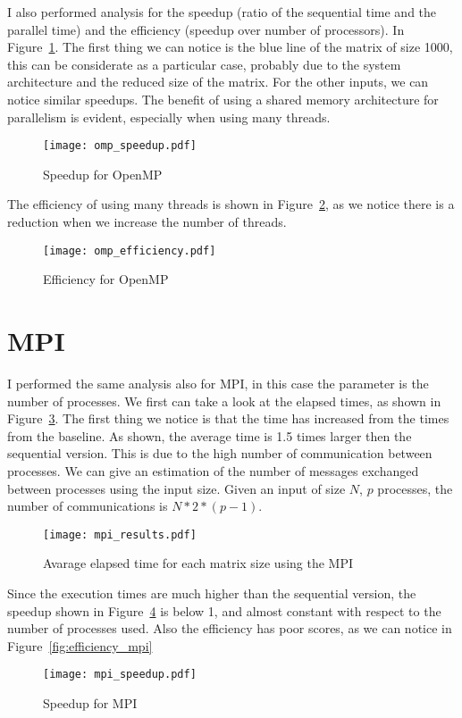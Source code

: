 I also performed analysis for the speedup (ratio of the sequential time and the parallel time) and the efficiency (speedup over number of processors). In Figure~\ref {fig:speedup_omp}. The first thing we can notice is the blue line of the matrix of size 1000, this can be considerate as a particular case, probably due to the system architecture and the reduced size of the matrix. For the other inputs, we can notice similar speedups. The benefit of using a shared memory architecture for parallelism is evident, especially when using many threads.

\begin{figure}[H]
\centering
\texttt{[image: omp\_speedup.pdf]}
\caption{Speedup for OpenMP}
\label{fig:speedup_omp}
\end{figure}

The efficiency of using many threads is shown in Figure~\ref{fig:efficiency_omp}, as we notice there is a reduction when we increase the number of threads. 

\begin{figure}[H]
\centering
\texttt{[image: omp\_efficiency.pdf]}
\caption{Efficiency for OpenMP}
\label{fig:efficiency_omp}
\end{figure}

\section{MPI}
I performed the same analysis also for MPI, in this case the parameter is the number of processes. We first can take a look at the elapsed times, as shown in Figure~\ref{fig:res_mpi}. The first thing we notice is that the time has increased from the times from the baseline. As shown, the average time is 1.5 times larger then the sequential version. This is due to the high number of communication between processes. We can give an estimation of the number of messages exchanged between processes using the input size. Given an input of size $N$, $p$ processes, the number of communications is $N * 2 * (p - 1)$.


\begin{figure}[H]
\centering
\texttt{[image: mpi\_results.pdf]}
\caption{Avarage elapsed time for each matrix size using the MPI}
\label{fig:res_mpi}
\end{figure}

Since the execution times are much higher than the sequential version, the speedup shown in Figure~\ref{fig:speedup_mpi} is below 1, and almost constant with respect to the number of processes used. Also the efficiency has poor scores, as we can notice in Figure~\ref{fig:efficiency_mpi} 
\begin{figure}[H]
\centering
\texttt{[image: mpi\_speedup.pdf]}
\caption{Speedup for MPI}
\label{fig:speedup_mpi}
\end{figure}

